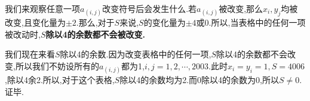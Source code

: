 \documentclass[UTF8]{ctexart}
\begin{document}
\par 我们来观察任意一项$a_{(i,j)}$改变符号后会发生什么.若$ a_{(i,j)} $被改变,那么$ x_i,y_j $均被改变,且变化量为$ \pm 2 $.那么,对于$ S $来说,$ S $的变化量为$ \pm 4 $或0.所以,当表格中的任何一项被改动时,\textbf{$S$除以4的余数都不会被改变.}
\par 我们现在来看$ S $除以4的余数.因为改变表格中的任何一项,$ S $除以4的余数都不会改变,所以我们不妨设所有的$ a_{(i,j)} $都为1,$ i,j=1,2,\cdots,2003 $.此时$ x_i=y_i=1,S=4006$,除以4余2.所以,对于这个表格,$ S $除以4的余数均为2.而0除以4的余数为0,所以$ S\neq 0 $.证毕.
\end{document}
